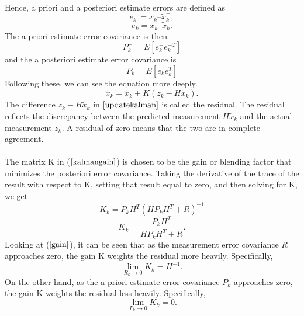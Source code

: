 \documentclass[a4paper,10pt]{report}
\begin{document}
\paragraph*{}
Hence, a priori and a posteriori estimate errors are defined as
\begin{equation}
e_k^- = x_k – \tilde x_k^- ,
\end{equation}
\begin{equation}
e_k =  x_k – \tilde x_k.
\end{equation}
The a priori estimate error covariance is then
\begin{equation}
P_k^- = E[ e_k^- e_k^{-T} ]
\end{equation}
and the a posteriori estimate error covariance is
\begin{equation}
P_k = E[e_k e_k^T]
\end{equation}
Following these, we can see the equation more deeply.
\begin{equation}
\tilde x_k = \tilde x_k + K(z_k-H\tilde x_k).
\label{updatekalman}
\end{equation}
The difference $z_k - H\tilde x_k$ in $\ref{updatekalman}$ is called the residual. The residual reflects the discrepancy between the
predicted measurement $H\tilde x_k$ and the actual measurement $z_k$. A residual of zero means that the two are in complete
agreement. \paragraph*{}
The matrix K in ($\ref{kalmangain}$) is chosen to be the gain or blending factor that minimizes the posteriori error covariance. Taking the derivative of the trace of the result with respect to K, setting that result equal to zero, and then solving for K, we get
\begin{equation}
K_k = P_kH^{T}(HP_kH^{T} + R)^{-1}
\end{equation}
\begin{equation}
K_k = \frac{P_kH^T}{HP_kH^T + R}.
\label{gain}
\end{equation}
Looking at ($\ref{gain}$), it can be seen that as the measurement error covariance $R$ approaches zero, the gain K weights the residual more
heavily. Specifically,
\begin{equation}
\mathop {\lim }\limits_{R_k \to 0 } {K_k} = H^{-1}.
\end{equation}
On the other hand, as the a priori estimate error covariance $P_k$ approaches zero, the gain K weights the residual less heavily. Specifically,
\begin{equation}
\mathop {\lim }\limits_{P_k \to 0 } {K_k} = 0.
\end{equation}
\end{document}
